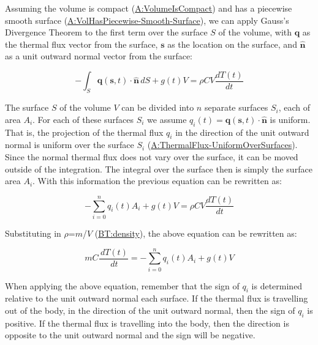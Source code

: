 \documentclass[12pt]{article}
\begin{document}
Assuming the volume is compact
(\hyperref[assumpVolCompact]{A:VolumeIsCompact}) and has a piecewise smooth
surface (\hyperref[assumpPiecewiseSmooth]{A:VolHasPiecewise-Smooth-Surface}), we
can apply Gauss's Divergence Theorem to the first term over the surface $S$ of
the volume, with $\symbf{q}$ as the thermal flux vector from the surface,
$\textbf{s}$ as the location on the surface, and $\symbf{\hat{n}}$ as a unit
outward normal vector from the surface:

\begin{displaymath}
-\int_{S}{\symbf{q}(\textbf{s}, t)\cdot{}\symbf{\hat{n}}}\,dS+ g(t) V=ρ C V \frac{dT(t)}{dt}
\end{displaymath}
        
The surface $S$ of the volume $V$ can be divided into $n$ separate surfaces
$S_i$, each of area $A_i$.  For each of these surfaces $S_i$ we assume $q_i (t)
= \mathbf{q}(\mathbf{s}, t) \cdot \symbf{\hat{n}}$ is uniform. That is, the
projection of the thermal flux $q_i$ in the direction of the unit outward normal
is uniform over the surface $S_i$
(\hyperref[assumpUnifThermFlux]{A:ThermalFlux-UniformOverSurfaces}).  Since the
normal thermal flux does not vary over the surface, it can be moved outside of
the integration.  The integral over the surface then is simply the surface area
$A_i$. With this information the previous equation can be rewritten as:

\begin{displaymath}
-\sum_{i=0}^n {q_i(t)} {A_i} + g(t) V = ρ C V \frac{dT(t)}{dt}
\end{displaymath}

Substituting in $ρ$=$m$/$V$ (\hyperref[BT:density]{BT:density}), the above
equation can be rewritten as:

\begin{displaymath}
m C \frac{\,dT(t)}{\,dt}= -\sum_{i=0}^n {q_i(t)} {A_i} + g(t) V
\end{displaymath}

When applying the above equation, remember that the sign of $q_i$ is determined
relative to the unit outward normal each surface.  If the thermal flux is
travelling out of the body, in the direction of the unit outward normal, then
the sign of $q_i$ is positive.  If the thermal flux is travelling into the body,
then the direction is opposite to the unit outward normal and the sign will be
negative.

\end{document}
